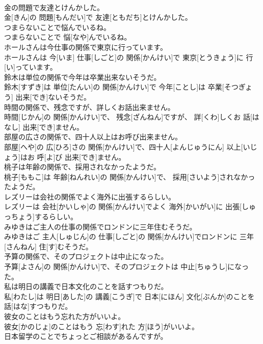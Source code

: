 \documentclass[8pt]{extreport}
\begin{document}
\begin{CJK}{UTF8}{min}
\\	金の問題で友達とけんかした。	
\\	金[きん]の 問題[もんだい]で 友達[ともだち]とけんかした。
\\	つまらないことで悩んでいるね。	
\\	つまらないことで 悩[なや]んでいるね。
\\	ホールさんは今仕事の関係で東京に行っています。	
\\	ホールさんは 今[いま] 仕事[しごと]の 関係[かんけい]で 東京[とうきょう]に 行[い]っています。
\\	鈴木は単位の関係で今年は卒業出来ないそうだ。	
\\	鈴木[すずき]は 単位[たんい]の 関係[かんけい]で 今年[ことし]は 卒業[そつぎょう] 出来[でき]ないそうだ。
\\	時間の関係で、残念ですが、詳しくお話出来ません。	
\\	時間[じかん]の 関係[かんけい]で、 残念[ざんねん]ですが、 詳[くわ]しくお 話[はなし] 出来[でき]ません。
\\	部屋の広さの関係で、四十人以上はお呼び出来ません。	
\\	部屋[へや]の 広[ひろ]さの 関係[かんけい]で、四十人[よんじゅうにん] 以上[いじょう]はお 呼[よ]び 出来[でき]ません。
\\	桃子は年齢の関係で、採用されなかったようだ。	
\\	桃子[ももこ]は 年齢[ねんれい]の 関係[かんけい]で、 採用[さいよう]されなかったようだ。
\\	レズリーは会社の関係でよく海外に出張するらしい。	
\\	レズリーは 会社[かいしゃ]の 関係[かんけい]でよく 海外[かいがい]に 出張[しゅっちょう]するらしい。
\\	みゆきはご主人の仕事の関係でロンドンに三年住むそうだ。	
\\	みゆきはご 主人[しゅじん]の 仕事[しごと]の 関係[かんけい]でロンドンに 三年[さんねん] 住[す]むそうだ。
\\	予算の関係で、そのプロジェクトは中止になった。	
\\	予算[よさん]の 関係[かんけい]で、そのプロジェクトは 中止[ちゅうし]になった。
\\	私は明日の講義で日本文化のことを話すつもりだ。	
\\	私[わたし]は 明日[あした]の 講義[こうぎ]で 日本[にほん] 文化[ぶんか]のことを 話[はな]すつもりだ。
\\	彼女のことはもう忘れた方がいいよ。	
\\	彼女[かのじょ]のことはもう 忘[わす]れた 方[ほう]がいいよ。
\\	日本留学のことでちょっとご相談があるんですが。	

\end{CJK}
\end{document}
